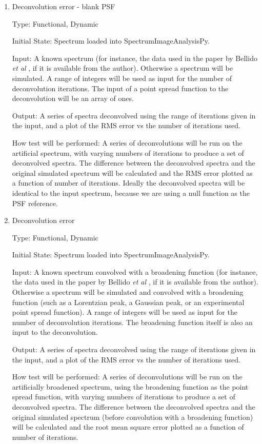 \documentclass[12pt, titlepage]{article}
\newcommand{\progname}{SpectrumImageAnalysisPy}
\begin{document}
\begin{enumerate}

\item{Deconvolution error - blank PSF}

Type: Functional, Dynamic
					
Initial State: Spectrum loaded into \progname{}.

Input: A known spectrum (for instance, the data used in the paper by Bellido \textit{et al} \cite{bellido_toward_2014}, if it is available from the author). Otherwise a spectrum will be simulated. A range of integers will be used as input for the number of deconvolution iterations. The input of a point spread function to the deconvolution will be an array of ones.

Output: A series of spectra deconvolved using the range of iterations given in the input, and a plot of the RMS error vs the number of iterations used.
					
How test will be performed: A series of deconvolutions will be run on the artificial spectrum, with varying numbers of iterations to produce a set of deconvolved spectra. The difference between the deconvolved spectra and the original simulated spectrum will be calculated and the RMS error plotted as a function of number of iterations. Ideally the deconvolved spectra will be identical to the input spectrum, because we are using a null function as the PSF reference.\\


\item{Deconvolution error}

Type: Functional, Dynamic
					
Initial State: Spectrum loaded into \progname{}.

Input: A known spectrum convolved with a broadening function (for instance, the data used in the paper by Bellido \textit{et al} \cite{bellido_toward_2014}, if it is available from the author). Otherwise a spectrum will be simulated and convolved with a broadening function (such as a Lorentzian peak, a Gaussian peak, or an experimental point spread function). A range of integers will be used as input for the number of deconvolution iterations. The broadening function itself is also an input to the deconvolution.

Output: A series of spectra deconvolved using the range of iterations given in the input, and a plot of the RMS error vs the number of iterations used.
					
How test will be performed: A series of deconvolutions will be run on the artificially broadened spectrum, using the broadening function as the point spread function, with varying numbers of iterations to produce a set of deconvolved spectra. The difference between the deconvolved spectra and the original simulated spectrum (before convolution with a broadening function) will be calculated and the root mean square error plotted as a function of number of iterations.\\


\end{enumerate}
\end{document}
